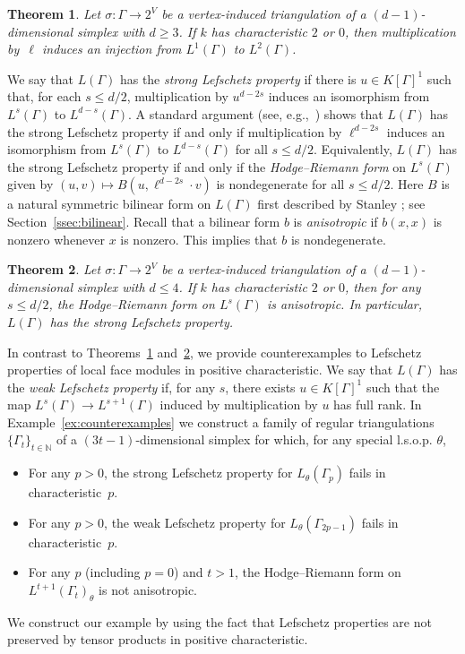 \documentclass[11pt]{article}
\newtheorem{theo}{Theorem}[section]
\theoremstyle{definition}
\numberwithin{equation}{section}
\numberwithin{equation}{section}
\begin{document}
\begin{theo}\label{thm:WL}
Let $\sigma \colon \Gamma \to 2^V$ be a vertex-induced triangulation of a $(d-1)$-dimensional simplex with $d \ge 3$. If $k$ has characteristic $2$ or $0$, then multiplication by~$\ell$ induces an injection from $L^1(\Gamma)$ to $L^2(\Gamma)$. 
\end{theo}

We say that $L(\Gamma)$ has the \emph{strong Lefschetz property} if there is $u \in K[\Gamma]^1$ such that, for each $s \le d/2$, multiplication by $u^{d- 2s}$ induces an isomorphism from $L^s(\Gamma)$ to $L^{d-s}(\Gamma)$. A standard argument (see, e.g.,~\cite[Lemma 5.1]{LNS}) shows that $L(\Gamma)$ has the strong Lefschetz property if and only if multiplication by $\ell^{d- 2s}$ induces an isomorphism from $L^s(\Gamma)$ to $L^{d-s}(\Gamma)$ for all $s \le d/2$. 
Equivalently, $L(\Gamma)$ has the strong Lefschetz property if and only if the \emph{Hodge--Riemann form} on $L^s(\Gamma)$ given by $(u, v) \mapsto B(u, \ell^{d - 2s} \cdot v)$ is nondegenerate  for all $s \le d/2$. Here $B$ is a natural symmetric bilinear form on $L(\Gamma)$ first described by Stanley 
\cite[Corollary 4.19]{Stanleylocalh}; see Section~\ref{ssec:bilinear}. 
Recall that a bilinear form $b$ is \emph{anisotropic} if $b(x,x)$ is nonzero whenever $x$ is nonzero. This implies that $b$ is nondegenerate. 

\begin{theo}\label{thm:SL}
Let $\sigma \colon \Gamma \to 2^V$ be a vertex-induced triangulation of a $(d-1)$-dimensional simplex with $d \le 4$. If $k$ has characteristic $2$ or $0$, then for any $s \le d/2$, the Hodge--Riemann form on $L^s(\Gamma)$ is anisotropic. In particular, $L(\Gamma)$ has the strong Lefschetz property. 

\end{theo}

In contrast to  Theorems~\ref{thm:WL} and~\ref{thm:SL}, 
we provide 
counterexamples to Lefschetz properties of local face modules in positive characteristic. We say that $L(\Gamma)$ has the \emph{weak Lefschetz property} if, for any $s$, there exists $u \in K[\Gamma]^1$ such that the map
$L^s(\Gamma) \to L^{s+1}(\Gamma)$ induced by multiplication by $u$ has full rank. 
In Example~\ref{ex:counterexamples} we construct a family of regular  triangulations $\{\Gamma_{t}\}_{t \in \mathbb{N}}$ of a $(3t-1)$-dimensional simplex for which, for any special l.s.o.p. $\theta$,
\begin{itemize}
		\item For any $p > 0$, the strong Lefschetz property for $L_{\theta}(\Gamma_p)$ fails in characteristic~$p$.
	\item For any $p > 0$, the weak Lefschetz property for $L_{\theta}(\Gamma_{2p - 1})$ fails in characteristic~$p$. 
	\item For any $p$ (including $p = 0$) and $t > 1$, 
	the Hodge--Riemann form on $L^{t + 1}(\Gamma_t)_{\theta}$ is not anisotropic. 
\end{itemize}
We construct our example by
using the fact that Lefschetz properties are not preserved by tensor products in positive characteristic.
\end{document}
